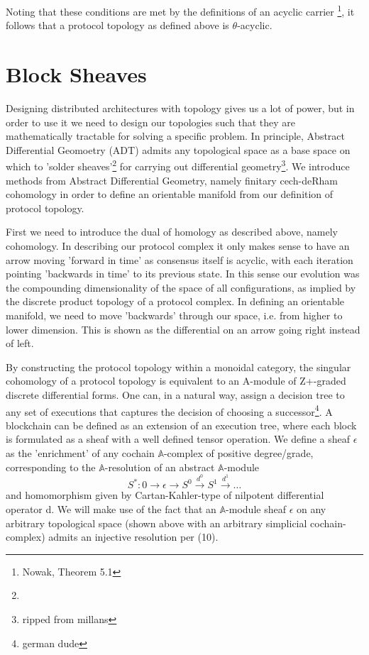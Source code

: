 \documentclass{article}
\begin{document}
Noting that these conditions are met by the definitions of an acyclic carrier \footnote{Nowak, Theorem 5.1}, it follows that a protocol topology as defined above is $\theta$-acyclic.

\section{Block Sheaves}
Designing distributed architectures with topology gives us a lot of power, but in order to use it we need to design our topologies such that they are mathematically tractable for solving a specific problem. In principle, Abstract Differential Geomoetry (ADT) admits any topological space as a base space on which to 'solder sheaves'\footnote{} for carrying out differential geometry\footnote{ripped from millans}. We introduce methods from Abstract Differential Geometry, namely finitary cech-deRham cohomology in order to define an orientable manifold from our definition of protocol topology.

First we need to introduce the dual of homology as described above, namely cohomology. In describing our protocol complex it only makes sense to have an arrow moving 'forward in time' as consensus itself is acyclic, with each iteration pointing 'backwards in time' to its previous state. In this sense our evolution was the compounding dimensionality of the space of all configurations, as implied by the discrete product topology of a protocol complex. In defining an orientable manifold, we need to move 'backwards' through our  space, i.e. from higher to lower dimension. This is shown as the differential on an arrow going right instead of left.

By constructing the protocol topology within a monoidal category, the singular cohomology of a protocol topology is equivalent to an A-module of Z+-graded discrete differential forms. One can, in a natural way, assign a decision tree to any set of executions that captures the decision of choosing a successor\footnote{german dude}. A blockchain can be defined as an extension of an execution tree, where each block is formulated as a sheaf with a well defined tensor operation. We define a sheaf $\epsilon$ as the 'enrichment' of any cochain $\mathbb{A}$-complex of positive degree/grade, corresponding to the $\mathbb{A}$-resolution of an abstract $\mathbb{A}$-module
\begin{equation} \label{eq1}
S^*: 0 \rightarrow \epsilon \rightarrow S^0 \xrightarrow{d^0} S^1 \xrightarrow{d^1} \dots
\end{equation} \label{eq1}
and homomorphism given by  Cartan-Kahler-type of nilpotent differential operator d. We will make use of the fact that an $\mathbb{A}$-module sheaf $\epsilon$ on any arbitrary topological space (shown above with an arbitrary simplicial cochain-complex) admits an injective resolution per (10).
\end{document}
